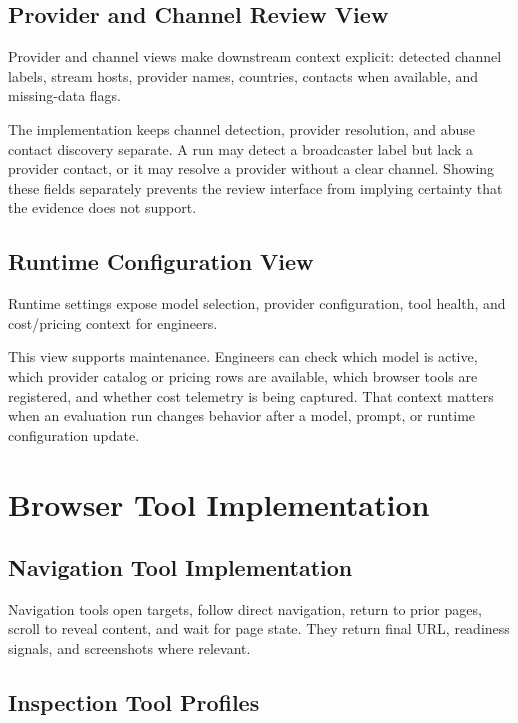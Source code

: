 \subsection{Provider and Channel Review View}

Provider and channel views make downstream context explicit: detected channel
labels, stream hosts, provider names, countries, contacts when available, and
missing-data flags.

The implementation keeps channel detection, provider resolution, and abuse
contact discovery separate. A run may detect a broadcaster label but lack a
provider contact, or it may resolve a provider without a clear channel. Showing
these fields separately prevents the review interface from implying certainty
that the evidence does not support.

\subsection{Runtime Configuration View}

Runtime settings expose model selection, provider configuration, tool health,
and cost/pricing context for engineers.

This view supports maintenance. Engineers can check which model is active,
which provider catalog or pricing rows are available, which browser tools are
registered, and whether cost telemetry is being captured. That context matters
when an evaluation run changes behavior after a model, prompt, or runtime
configuration update.



\section{Browser Tool Implementation}

\subsection{Navigation Tool Implementation}

Navigation tools open targets, follow direct navigation, return to prior pages,
scroll to reveal content, and wait for page state. They return final URL,
readiness signals, and screenshots where relevant.

\subsection{Inspection Tool Profiles}

